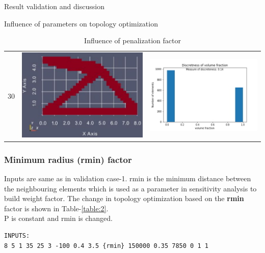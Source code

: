 \documentclass[a4paper,12pt,times]{article}
\begin{document}
\begin{section}{Result validation and discussion}
\begin{subsection}{Influence of parameters on topology optimization}
\begin{center}
\begin{table} [H]
\begin{tabular}{c|c|c}
30&\includegraphics[scale = 0.5]{penal_30.png} & \includegraphics[scale = 0.4]{MMA_discretness_penal_30.png}\\ 
\end{tabular} 
\caption{Influence of penalization factor} 
\label{table:1} 
\end{table} 
\end{center}
\subsubsection{Minimum radius (rmin) factor}
Inputs are same as in validation case-1. rmin is the minimum distance between the neighbouring elements which is used as a parameter in sensitivity analysis to build weight factor. 
The change in topology optimization based on the  \textbf{rmin} factor is shown in Table-\ref{table:2}. \\
P is constant and {rmin} is changed.
\begin{lstlisting}
INPUTS:
8 5 1 35 25 3 -100 0.4 3.5 {rmin} 150000 0.35 7850 0 1 1
\end{lstlisting}

\end{subsection}
\end{section}
\end{document}
